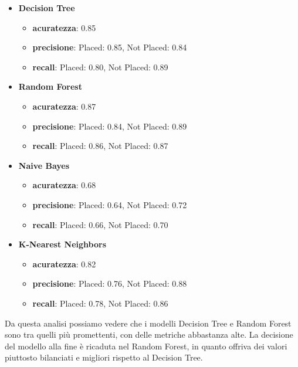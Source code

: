 \documentclass[12pt]{article}
\begin{document}
\begin{itemize}
    \item \textbf{Decision Tree}
          \begin{itemize}
              \item \textbf{acuratezza}: 0.85
              \item \textbf{precisione}: Placed: 0.85, Not Placed: 0.84
              \item \textbf{recall}: Placed: 0.80, Not Placed: 0.89
          \end{itemize}
    \item \textbf{Random Forest}
          \begin{itemize}
              \item \textbf{acuratezza}: 0.87
              \item \textbf{precisione}: Placed: 0.84, Not Placed: 0.89
              \item \textbf{recall}: Placed: 0.86, Not Placed: 0.87
          \end{itemize}
    \item \textbf{Naive Bayes}
          \begin{itemize}
              \item \textbf{acuratezza}: 0.68
              \item \textbf{precisione}: Placed: 0.64, Not Placed: 0.72
              \item \textbf{recall}: Placed: 0.66, Not Placed: 0.70
          \end{itemize}
    \item \textbf{K-Nearest Neighbors}
          \begin{itemize}
              \item \textbf{acuratezza}: 0.82
              \item \textbf{precisione}: Placed: 0.76, Not Placed: 0.88
              \item \textbf{recall}: Placed: 0.78, Not Placed: 0.86
          \end{itemize}
\end{itemize}
Da questa analisi possiamo vedere che i modelli Decision Tree e Random Forest sono tra quelli più promettenti, con delle metriche abbastanza alte.
La decisione del modello alla fine è ricaduta nel Random Forest, in quanto offriva dei valori piuttosto bilanciati e migliori rispetto al Decision Tree.
\end{document}
